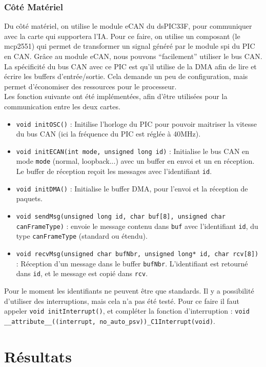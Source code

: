\documentclass[a4,french,12pt]{article}
\begin{document}
\subsubsection{Côté Matériel}
Du côté matériel, on utilise le module eCAN du dsPIC33F, pour communiquer avec la carte qui supportera l'IA. Pour ce faire, 
on utilise un composant (le mcp2551) qui permet de transformer un signal généré par le module spi du PIC en CAN. Grâce au 
module eCAN, nous pouvons ``facilement'' utiliser le bus CAN. \\
La spécificité du bus CAN avec ce PIC est qu'il utilise de la DMA afin de lire et écrire les buffers d'entrée/sortie. Cela 
demande un peu de configuration, mais permet d'économiser des ressources pour le processeur. \\
Les fonction suivante ont été implémentées, afin d'être utilisées pour la communication entre les deux cartes.
\begin{itemize}
\item \texttt{void initOSC()} : Initilise l'horloge du PIC pour pouvoir maitriser la vitesse du bus CAN (ici la fréquence du PIC 
  est réglée à 40MHz).
\item \texttt{void initECAN(int mode, unsigned long id)} : Initialise le bus CAN en mode \texttt{mode} (normal, loopback...) 
  avec un buffer en envoi et un en réception. Le buffer de réception reçoit les messages avec l'identifiant \texttt{id}.
\item \texttt{void initDMA()} : Initialise le buffer DMA, pour l'envoi et la réception de paquets.
\item \texttt{void sendMsg(unsigned long id, char buf[8], unsigned char canFrameType)} : envoie le message contenu dans 
  \texttt{buf} avec l'identifiant \texttt{id}, du type \texttt{canFrameType} (standard ou étendu).
\item \texttt{void recvMsg(unsigned char bufNbr, unsigned long* id, char rcv[8])} : Réception d'un message dans le buffer 
  \texttt{bufNbr}. L'identifiant est retourné dans \texttt{id}, et le message est copié dans \texttt{rcv}.\\
\end{itemize} 
Pour le moment les identifiants ne peuvent être que standards. Il y a possibilité d'utiliser des interruptions, mais cela 
n'a pas été testé. Pour ce faire il faut appeler \texttt{void initInterrupt()}, et compléter la fonction d'interruption : 
\texttt{void \_\_attribute\_\_((interrupt, no\_auto\_psv))\_C1Interrupt(void)}.

\newpage
\section{Résultats}
\end{document}
